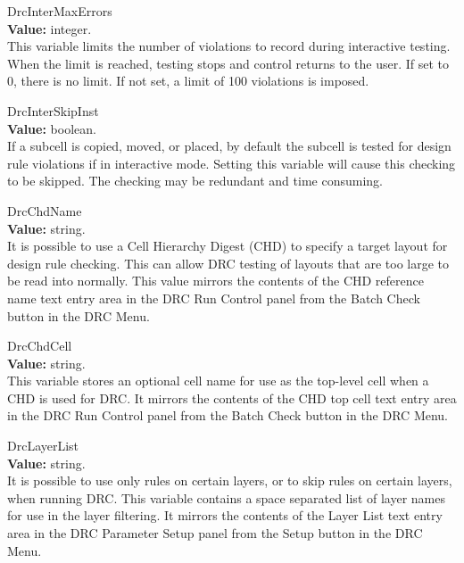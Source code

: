 \begin{description}
\item{\et DrcInterMaxErrors}\\
{\bf Value:} integer.\\
This variable limits the number of violations to record during
interactive testing.  When the limit is reached, testing stops and
control returns to the user.  If set to 0, there is no limit.  If not
set, a limit of 100 violations is imposed.

\item{\et DrcInterSkipInst}\\
{\bf Value:} boolean.\\
If a subcell is copied, moved, or placed, by default the subcell is
tested for design rule violations if in interactive mode.  Setting
this variable will cause this checking to be skipped.  The checking
may be redundant and time consuming.

\item{\et DrcChdName}\\
{\bf Value:} string.\\
It is possible to use a Cell Hierarchy Digest (CHD) to specify a
target layout for design rule checking.  This can allow DRC testing of
layouts that are too large to be read into {\Xic} normally.  This
value mirrors the contents of the {\cb CHD reference name} text entry
area in the {\cb DRC Run Control} panel from the {\cb Batch Check}
button in the {\cb DRC Menu}.

\item{\et DrcChdCell}\\
{\bf Value:} string.\\
This variable stores an optional cell name for use as the top-level
cell when a CHD is used for DRC.  It mirrors the contents of the {\cb
CHD top cell} text entry area in the {\cb DRC Run Control} panel from
the {\cb Batch Check} button in the {\cb DRC Menu}.

\item{\et DrcLayerList}\\
{\bf Value:} string.\\
It is possible to use only rules on certain layers, or to skip rules
on certain layers, when running DRC.  This variable contains a space
separated list of layer names for use in the layer filtering.  It
mirrors the contents of the {\cb Layer List} text entry area in the
{\cb DRC Parameter Setup} panel from the {\cb Setup} button in the
{\cb DRC Menu}.


\end{description}
